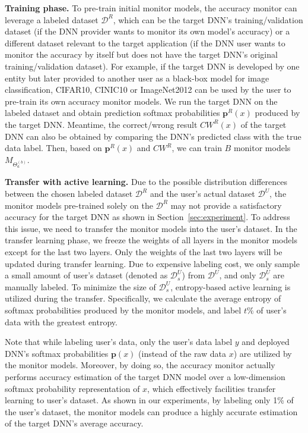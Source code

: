 \documentclass{article}
\begin{document}
\textbf{Training phase.}
To pre-train initial monitor models,
the accuracy monitor
can leverage a labeled dataset $\mathcal{D}^R$,
which can be the target DNN's training/validation dataset
(if the DNN provider wants to monitor its own model's
accuracy)
or a different dataset relevant to the target application
(if the DNN user wants to monitor the
accuracy by itself but does not have the target DNN's original
training/validation dataset).
For example, if the target
DNN is developed by one entity
but later provided to another user as a black-box model
for image classification,
 CIFAR10, CINIC10 or ImageNet2012 can be used by
 the user to pre-train its own accuracy monitor models. We run
  the target DNN on the labeled dataset and obtain prediction softmax probabilities $\mathbf{p}^R(x)$
 produced by the target DNN. Meantime, the correct/wrong
 result $CW^R(x)$  of the target DNN
 can also be obtained by comparing the DNN's predicted class
 with the true data label. Then, based on $\mathbf{p}^R(x)$ and  $CW^R$,
 we can train $B$ monitor models $M_{\Theta_a^{(b)}}$.

\textbf{Transfer with active learning. } Due to the possible distribution differences between the chosen labeled dataset $\mathcal{D}^R$ and the user's actual dataset $\mathcal{D}^U$, the
monitor models pre-trained solely on the $\mathcal{D}^R$ may not provide a satisfactory accuracy for the target
DNN as shown in Section~\ref{sec:experiment}.
To address this issue,
we need to transfer the monitor models into  the user's dataset.
In the transfer learning phase, we freeze the weights of all layers in the monitor models except for the last two layers. Only the weights of the last two layers will be updated during transfer learning. Due to expensive labeling cost, we only sample a small amount
of user's dataset (denoted as $\mathcal{D}_s^U$) from
 $\mathcal{D}^U$, and only $\mathcal{D}_s^U$ are manually labeled. To minimize the size of $\mathcal{D}_s^U$, entropy-based active learning \cite{ensemble_active_learning_2018} is utilized during the transfer. {Specifically, we calculate the average entropy of softmax probabilities produced by the monitor models, and
 label $t\%$ of user's data with the greatest entropy.}

 Note that while labeling user's data, only the user's data label $y$ and deployed DNN's softmax probabilities $\mathbf{p}(x)$
 (instead of the raw data $x$) are utilized
 by the monitor models.
 Moreover, by doing so, the accuracy monitor actually performs accuracy estimation
 of the target DNN model
 over a low-dimension softmax probability representation of $x$,
 which effectively facilities transfer learning to user's dataset. As shown in
 our experiments,
 by labeling only 1\% of the user's dataset, the monitor models can produce a highly accurate estimation of the target DNN's average accuracy.
\end{document}

